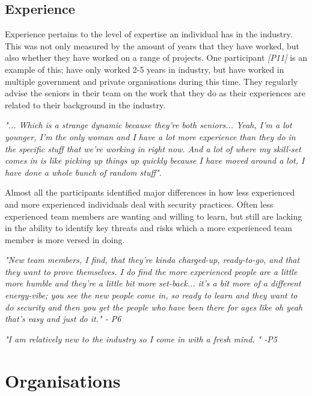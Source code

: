 \subsection{Experience}

\par Experience pertains to the level of expertise an individual has in the industry. This was not only measured by the amount of years that they have worked, but also whether they have worked on a range of projects. One participant \textit{[P11]} is an example of this; have only worked 2-5 years in industry, but have worked in multiple government and private organisations during this time. They regularly advise the seniors in their team on the work that they do as their experiences are related to their background in the industry.
\newline
\par
\textit{"... Which is a strange dynamic because they're both seniors... Yeah, I'm a lot younger, I'm the only woman and I have a lot more experience than they do in the specific stuff that we're working in right now. And a lot of where my skill-set comes in is like picking up things up quickly because I have moved around a lot, I have done a whole bunch of random stuff".}
\newline
\par
Almost all the participants identified major differences in how less experienced and more experienced individuals deal with security practices. Often less experienced team members are wanting and willing to learn, but still are lacking in the ability to identify key threats and risks which a more experienced team member is more versed in doing. 
\newline
\par
\textit{"New team members, I find, that they're kinda charged-up, ready-to-go, and that they want to prove themselves. I do find the more experienced people are a little more humble and they're a little bit more set-back... it's a bit more of a  different energy-vibe; you see the new people come in, so ready to learn and they want to do security and then you get the people who have been there for ages like oh yeah that's easy and just do it." - P6 }
\newline
\par
\textit{"I am relatively new to the industry so I come in with a fresh mind. " -P5}

\section{Organisations}

